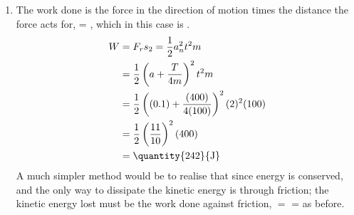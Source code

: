 \begin{problem}[A1987PSIIQ9a]
{\begin{enumerate}
	\item The work done is the force in the direction of motion times the distance the force acts for,  = , which in this case is .
\begin{eqnarray*} 
W &= F_{r}s_{2} = \frac{1}{2} a_{n}^{2} t^{2} m \\ 
	&= \frac{1}{2} \left( a +\frac{T}{4m} \right)^{2} t^{2} m \\
	&= \frac{1}{2} \left( (0.1) + \frac{(400)}{4(100)} \right)^{2} (2)^{2} (100)\\
	&= \frac{1}{2} \left( \frac{11}{10} \right)^{2} (400) \\
	&= \mbox{\quantity{242}{J}}
	\end{eqnarray*}
A much simpler method would be to realise that since energy is conserved, and the only way to dissipate the kinetic energy is through friction; the kinetic energy lost must be the work done against friction,  $=$  =  as before.
\end{enumerate}
}
\end{problem}